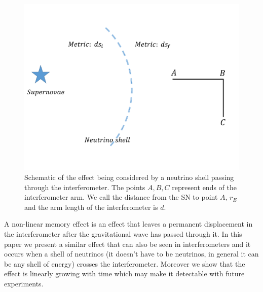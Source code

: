 \documentclass[aps,showpacs,twocolumn,floats,prd,superscriptaddress,nofootinbib]{revtex4-1}
\begin{document}
\begin{figure}[h!]
\begin{center}
\includegraphics[scale = 0.3]{intro.pdf}
\caption{Schematic of the effect being considered by a neutrino shell passing through the interferometer. The points $A,B,C$ represent ends of the interferometer arm. We call the distance from the SN to point $A$, $r_E$ and the arm length of the interferometer is $d$.}
\label{fig:1}
\end{center}
\end{figure}

A non-linear memory effect is an effect that leaves a permanent displacement in the interferometer after the gravitational wave has passed through it. In this paper we present a similar effect that can also be seen in interferometers and it occurs when a shell of neutrinos (it doesn't have to be neutrinos, in general it can be any shell of energy) crosses the interferometer. Moreover we show that the effect is linearly growing with time which may make it detectable with future experiments.
\end{document}
